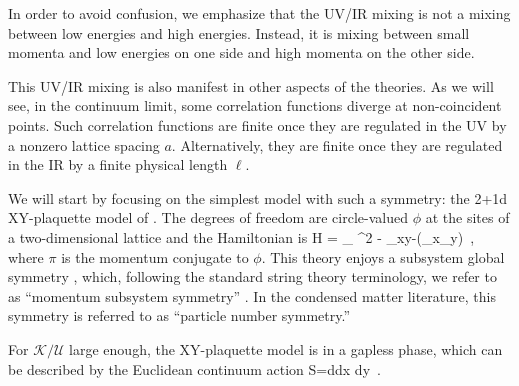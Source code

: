 \documentclass[12pt]{article}
\numberwithin{equation}{section}
\begin{document}
In order to avoid confusion, we emphasize that the UV/IR mixing is not a mixing between low energies and high energies.  Instead, it is mixing between small momenta and low energies on one side and high momenta on the other side.

This UV/IR mixing is also manifest in other aspects of the theories.    As we will see, in the continuum limit, some correlation functions diverge at non-coincident points.  Such correlation functions are finite once they are regulated in the UV by a nonzero lattice spacing $a$.  Alternatively, they are finite once they are regulated in the IR by a finite physical length $\ell$.


We will start by focusing on the simplest model with such a symmetry: the 2+1d XY-plaquette model of \cite{PhysRevB.66.054526}.  The degrees of freedom are circle-valued $\phi$ at the sites of a two-dimensional lattice and the Hamiltonian is
\ie\label{eq:iH_XY_plaq}
H  = {  } \sum_{} \pi^2 - { }\sum_{xy-}\cos(\Delta_x\Delta_y\phi)~,
\fe
where $\pi$ is the momentum conjugate to $\phi$.   This theory enjoys a subsystem global symmetry \cite{PhysRevB.66.054526}, which, following the standard string theory terminology, we refer to as ``momentum subsystem symmetry'' \cite{paper1}.  In the condensed matter literature, this symmetry is referred to as ``particle number symmetry.''

For ${\mathcal{K}/ \mathcal{U}}$ large enough,  the XY-plaquette model is in a gapless phase, which can be described by the Euclidean continuum action \cite{PhysRevB.66.054526}
\ie\label{eq:i action_continuum}
S=\int d\tau dx dy~.
\fe
\end{document}
